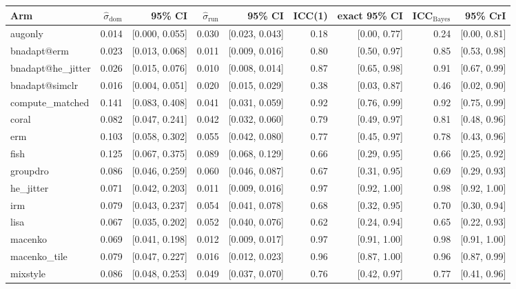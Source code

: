 \begin{tabular}{lrrrrrrrr}
\toprule
Arm & $\hat\sigma_\text{dom}$ & 95\% CI & $\hat\sigma_\text{run}$ & 95\% CI & ICC(1) & exact 95\% CI & ICC$_\text{Bayes}$ & 95\% CrI \\
\midrule
augonly & 0.014 & [0.000, 0.055] & 0.030 & [0.023, 0.043] & 0.18 & [0.00, 0.77] & 0.24 & [0.00, 0.81] \\
bnadapt@erm & 0.023 & [0.013, 0.068] & 0.011 & [0.009, 0.016] & 0.80 & [0.50, 0.97] & 0.85 & [0.53, 0.98] \\
bnadapt@he\_jitter & 0.026 & [0.015, 0.076] & 0.010 & [0.008, 0.014] & 0.87 & [0.65, 0.98] & 0.91 & [0.67, 0.99] \\
bnadapt@simclr & 0.016 & [0.004, 0.051] & 0.020 & [0.015, 0.029] & 0.38 & [0.03, 0.87] & 0.46 & [0.02, 0.90] \\
compute\_matched & 0.141 & [0.083, 0.408] & 0.041 & [0.031, 0.059] & 0.92 & [0.76, 0.99] & 0.92 & [0.75, 0.99] \\
coral & 0.082 & [0.047, 0.241] & 0.042 & [0.032, 0.060] & 0.79 & [0.49, 0.97] & 0.81 & [0.48, 0.96] \\
erm & 0.103 & [0.058, 0.302] & 0.055 & [0.042, 0.080] & 0.77 & [0.45, 0.97] & 0.78 & [0.43, 0.96] \\
fish & 0.125 & [0.067, 0.375] & 0.089 & [0.068, 0.129] & 0.66 & [0.29, 0.95] & 0.66 & [0.25, 0.92] \\
groupdro & 0.086 & [0.046, 0.259] & 0.060 & [0.046, 0.087] & 0.67 & [0.31, 0.95] & 0.69 & [0.29, 0.93] \\
he\_jitter & 0.071 & [0.042, 0.203] & 0.011 & [0.009, 0.016] & 0.97 & [0.92, 1.00] & 0.98 & [0.92, 1.00] \\
irm & 0.079 & [0.043, 0.237] & 0.054 & [0.041, 0.078] & 0.68 & [0.32, 0.95] & 0.70 & [0.30, 0.94] \\
lisa & 0.067 & [0.035, 0.202] & 0.052 & [0.040, 0.076] & 0.62 & [0.24, 0.94] & 0.65 & [0.22, 0.93] \\
macenko & 0.069 & [0.041, 0.198] & 0.012 & [0.009, 0.017] & 0.97 & [0.91, 1.00] & 0.98 & [0.91, 1.00] \\
macenko\_tile & 0.079 & [0.047, 0.227] & 0.016 & [0.012, 0.023] & 0.96 & [0.87, 1.00] & 0.96 & [0.87, 0.99] \\
mixstyle & 0.086 & [0.048, 0.253] & 0.049 & [0.037, 0.070] & 0.76 & [0.42, 0.97] & 0.77 & [0.41, 0.96] \\

\end{tabular}
